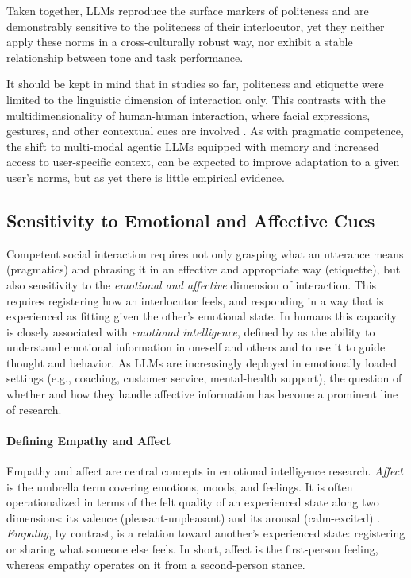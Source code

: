 Taken together, LLMs reproduce the surface markers of politeness and are demonstrably sensitive to the politeness of their interlocutor, yet they neither apply these norms in a cross-culturally robust way, nor exhibit a stable relationship between tone and task performance. 

It should be kept in mind that in studies so far, politeness and etiquette were limited to the linguistic dimension of interaction only. This contrasts with the multidimensionality of human-human interaction, where facial expressions, gestures, and other contextual cues  are involved %
\citep{brown1987politeness}. As with pragmatic competence, the shift to multi-modal agentic LLMs equipped with memory and increased access to  user-specific context, can be expected to improve adaptation to a given user's norms, but as yet there is little empirical evidence.

\subsection{Sensitivity to Emotional and Affective Cues} \label{sec:empathy}
Competent social interaction requires not only grasping what an utterance means (pragmatics) and phrasing it in an effective and appropriate way (etiquette), but also sensitivity to the \emph{emotional and affective} dimension of interaction. This requires registering how an interlocutor feels, and responding in a way that is experienced as fitting given the other's emotional state. In humans this capacity is closely associated with \emph{emotional intelligence}, defined by \citet{salovey1990emotional} as the ability to understand emotional information in oneself and others and to use it to guide thought and behavior. As LLMs are increasingly deployed in emotionally loaded settings (e.g., coaching, customer service, mental-health support), the question of whether and how they handle affective information has become a prominent line of research.

\paragraph{Defining Empathy and Affect} 
Empathy and affect are central concepts in emotional intelligence research. \emph{Affect} is the umbrella term covering emotions, moods, and feelings. It is often operationalized in terms of the felt quality of an experienced state along two dimensions: its valence (pleasant-unpleasant) and its arousal (calm-excited) \citep{russell1980circumplex}. \emph{Empathy}, by contrast, is a relation toward another's experienced state: registering or sharing what someone else feels. In short, affect is the first-person feeling, whereas empathy operates on it from a second-person stance.

